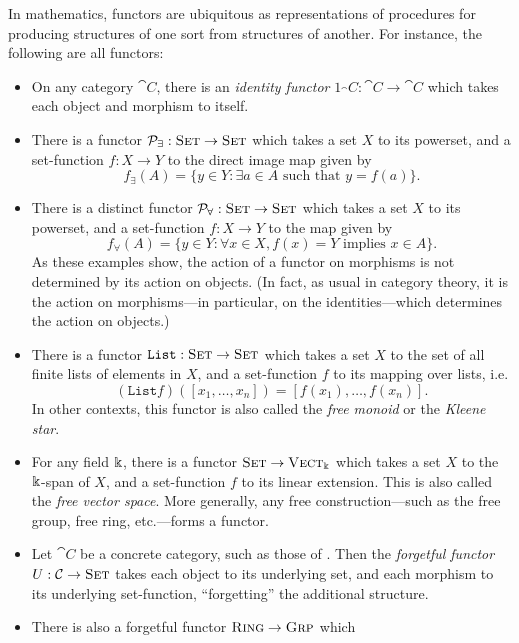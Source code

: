 \begin{ex}
  In mathematics, functors are ubiquitous as representations of procedures for
  producing structures of one sort from structures of another. For instance, the
  following are all functors:
  \begin{itemize}
    \item On any category $\cat{C}$, there is an \emph{identity functor}
      $1_\cat{C}: \cat{C}\to\cat{C}$ which takes each object and morphism to
      itself.
    \item There is a functor $\mathcal{P}_\exists: {\textsc{\text{Set}}}\to{\textsc{\text{Set}}}$ which takes
      a set $X$ to its powerset, and a set-function $f: X\to Y$ to the direct
      image map given by \[
        f_\exists(A) = \{y\in Y: \exists a\in A \text{ such that } y = f(a)\}.
      \]
    \item There is a distinct functor $\mathcal{P}_\forall: {\textsc{\text{Set}}}\to{\textsc{\text{Set}}}$
      which takes a set $X$ to its powerset, and a set-function $f: X\to Y$ to
      the map given by \[
        f_\forall(A) = \{y\in Y: \forall x\in X, f(x) = Y \text{ implies } x\in A\}.
      \] As these examples show, the action of a functor on morphisms is not
      determined by its action on objects. (In fact, as usual in category
      theory, it is the action on morphisms---in particular, on the
      identities---which determines the action on objects.)
    \item There is a functor $\texttt{List}: {\textsc{\text{Set}}}\to{\textsc{\text{Set}}}$ which
      takes a set $X$ to the set of all finite lists of elements in $X$, and a
      set-function $f$ to its mapping over lists, i.e. \[
        (\texttt{List}f)([x_1, \ldots, x_n]) = [f(x_1), \ldots, f(x_n)].
      \]  In other contexts, this functor is also called the \emph{free
      monoid} or the \emph{Kleene star}.
    \item For any field $\Bbbk$, there is a functor ${\textsc{\text{Set}}}\to{\textsc{\text{Vect}}}_\Bbbk$ which
      takes a set $X$ to the $\Bbbk$-span of $X$, and a set-function $f$ to
      its linear extension. This is also called the \emph{free vector space}.
      More generally, any free construction---such as the free group, free ring,
      etc.---forms a functor.
    \item Let $\cat{C}$ be a concrete category, such as those of .
      Then the \emph{forgetful functor} $U: {\mathcal{C}}\to{\textsc{\text{Set}}}$ takes each object to
      its underlying set, and each morphism to its underlying set-function,
      ``forgetting'' the additional structure.
    \item There is also a forgetful functor ${\textsc{\text{Ring}}}\to{\textsc{\text{Grp}}}$ which

\end{itemize}
\end{ex}
